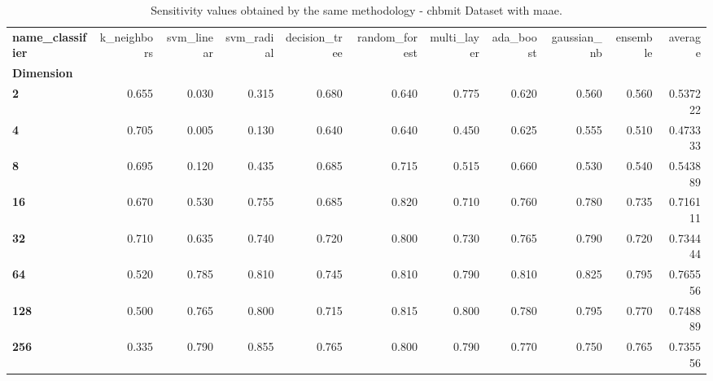 \begin{table}
\centering
\caption{Sensitivity values obtained by the same methodology - chbmit Dataset with maae.}
\label{sensitivity_chbmit_maae-reproduction}
\begin{tabular}{lrrrrrrrrrr}
\toprule
\textbf{name\_classifier} &  k\_neighbors &  svm\_linear &  svm\_radial &  decision\_tree &  random\_forest &  multi\_layer &  ada\_boost &  gaussian\_nb &  ensemble &   average \\
\textbf{Dimension} &              &             &             &                &                &              &            &              &           &           \\
\midrule
\textbf{2        } &        0.655 &       0.030 &       0.315 &          0.680 &          0.640 &        0.775 &      0.620 &        0.560 &     0.560 &  0.537222 \\
\textbf{4        } &        0.705 &       0.005 &       0.130 &          0.640 &          0.640 &        0.450 &      0.625 &        0.555 &     0.510 &  0.473333 \\
\textbf{8        } &        0.695 &       0.120 &       0.435 &          0.685 &          0.715 &        0.515 &      0.660 &        0.530 &     0.540 &  0.543889 \\
\textbf{16       } &        0.670 &       0.530 &       0.755 &          0.685 &          0.820 &        0.710 &      0.760 &        0.780 &     0.735 &  0.716111 \\
\textbf{32       } &        0.710 &       0.635 &       0.740 &          0.720 &          0.800 &        0.730 &      0.765 &        0.790 &     0.720 &  0.734444 \\
\textbf{64       } &        0.520 &       0.785 &       0.810 &          0.745 &          0.810 &        0.790 &      0.810 &        0.825 &     0.795 &  0.765556 \\
\textbf{128      } &        0.500 &       0.765 &       0.800 &          0.715 &          0.815 &        0.800 &      0.780 &        0.795 &     0.770 &  0.748889 \\
\textbf{256      } &        0.335 &       0.790 &       0.855 &          0.765 &          0.800 &        0.790 &      0.770 &        0.750 &     0.765 &  0.735556 \\
\bottomrule
\end{tabular}
\end{table}
